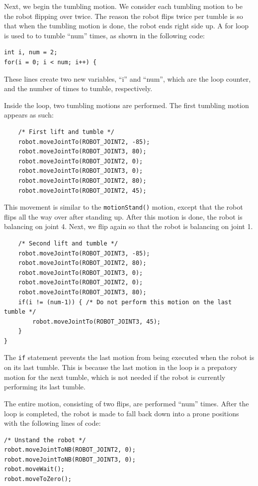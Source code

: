 \documentclass{article}
\begin{document}
Next, we begin the tumbling motion. We consider each tumbling motion to be the 
robot flipping over twice. The reason the robot flips twice per tumble is so that
when the tumbling motion is done, the robot ends right side up. 
A for loop is used to to tumble ``num'' times, as shown in the following code:
\begin{verbatim}
int i, num = 2;
for(i = 0; i < num; i++) {
\end{verbatim}
These lines create two new variables, ``i'' and ``num'', which are the loop
counter, and the number of times to tumble, respectively. 

Inside the loop, two tumbling motions are performed. The first tumbling
motion appears as such:
\begin{verbatim}
    /* First lift and tumble */
    robot.moveJointTo(ROBOT_JOINT2, -85);
    robot.moveJointTo(ROBOT_JOINT3, 80);
    robot.moveJointTo(ROBOT_JOINT2, 0);
    robot.moveJointTo(ROBOT_JOINT3, 0);
    robot.moveJointTo(ROBOT_JOINT2, 80);
    robot.moveJointTo(ROBOT_JOINT2, 45);
\end{verbatim}
This movement is similar to the \texttt{motionStand()} motion, except that the
robot flips all the way over after standing up. After this motion is done,
the robot is balancing on joint 4. Next, we flip again so that the robot
is balancing on joint 1.
\begin{verbatim}
    /* Second lift and tumble */
    robot.moveJointTo(ROBOT_JOINT3, -85);
    robot.moveJointTo(ROBOT_JOINT2, 80);
    robot.moveJointTo(ROBOT_JOINT3, 0);
    robot.moveJointTo(ROBOT_JOINT2, 0);
    robot.moveJointTo(ROBOT_JOINT3, 80);
    if(i != (num-1)) { /* Do not perform this motion on the last tumble */
        robot.moveJointTo(ROBOT_JOINT3, 45);
    }
}
\end{verbatim}
The \texttt{if} statement prevents the last motion from being executed
when the robot is on its last tumble. This is because the last motion in the
loop is a prepatory motion for the next tumble, which is not needed if the
robot is currently performing its last tumble. 

The entire motion, consisting of two flips, are performed ``num'' times. After
the loop is completed, the robot is made to fall back down into a prone
positions with the following lines of code:
\begin{verbatim}
/* Unstand the robot */
robot.moveJointToNB(ROBOT_JOINT2, 0);
robot.moveJointToNB(ROBOT_JOINT3, 0);
robot.moveWait();
robot.moveToZero();
\end{verbatim}
\end{document}

